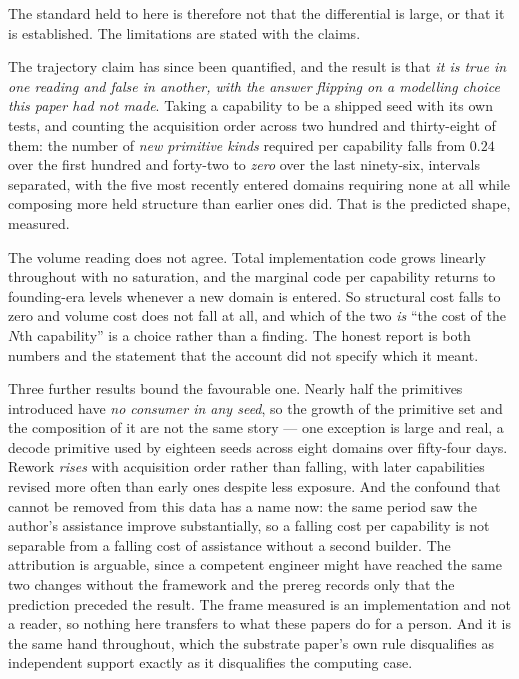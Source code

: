 \documentclass[11pt,a4paper]{article}
\theoremstyle{remark}\newtheorem{remark}[definition]{Remark}
\begin{document}
The standard held to here is therefore not that the differential is large, or that it
is established. The limitations are stated with the claims.


The trajectory claim has since been quantified, and the result is that \emph{it is true in one reading
and false in another, with the answer flipping on a modelling choice this paper had not made}. Taking a
capability to be a shipped seed with its own tests, and counting the acquisition order across two
hundred and thirty-eight of them: the number of \emph{new primitive kinds} required per capability falls
from $0.24$ over the first hundred and forty-two to \emph{zero} over the last ninety-six, intervals
separated, with the five most recently entered domains requiring none at all while composing more held
structure than earlier ones did. That is the predicted shape, measured.

The volume reading does not agree. Total implementation code grows linearly throughout with no
saturation, and the marginal code per capability returns to founding-era levels whenever a new domain is
entered. So structural cost falls to zero and volume cost does not fall at all, and which of the two
\emph{is} ``the cost of the $N$th capability'' is a choice rather than a finding. The honest report is
both numbers and the statement that the account did not specify which it meant.

Three further results bound the favourable one. Nearly half the primitives introduced have \emph{no consumer in any seed}, so the growth of the
primitive set and the composition of it are not the same story --- one exception is large and real, a
decode primitive used by eighteen seeds across eight domains over fifty-four days. Rework \emph{rises}
with acquisition order rather than falling, with later capabilities revised more often than early ones
despite less exposure. And the confound that cannot be removed from this data has a name now: the same
period saw the author's assistance improve substantially, so a falling cost per capability is not
separable from a falling cost of assistance without a second builder. The attribution is arguable, since a competent engineer might have
reached the same two changes without the framework and the prereg records only that the prediction
preceded the result. The frame measured is an implementation and not a reader, so nothing here
transfers to what these papers do for a person. And it is the same hand throughout, which the substrate paper's
own rule disqualifies as independent support exactly as it disqualifies the computing case.
\end{document}
